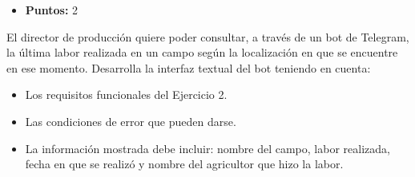 
\begin{itemize}
    \item \textbf{Puntos:} 2
\end{itemize}

\begin{enunciado}
    El director de producción quiere poder consultar, a través de un bot de Telegram, la última labor
    realizada en un campo según la localización en que se encuentre en ese momento.
    Desarrolla la interfaz textual del bot teniendo en cuenta:
    \begin{itemize}
        \item Los requisitos funcionales del Ejercicio 2.
        \item Las condiciones de error que pueden darse.
        \item La información mostrada debe incluir: nombre del campo, labor realizada, fecha en que
        se realizó y nombre del agricultor que hizo la labor.
    \end{itemize}
\end{enunciado}

